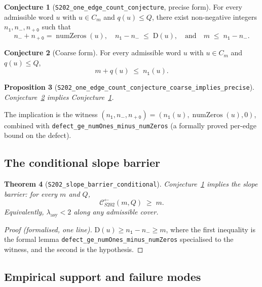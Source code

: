 \documentclass[11pt,a4paper]{article}
\theoremstyle{plain}
\newtheorem{theorem}{Theorem}[section]
\newtheorem{proposition}[theorem]{Proposition}
\theoremstyle{definition}
\newtheorem{conjecture}[theorem]{Conjecture}
\newcommand{\defect}{\mathrm{D}}
\newcommand{\Cback}{\mathcal{C}^{\!\leftarrow}_{S202}}
\newcommand{\numOnes}{n_{\mathtt{1}}}
\newcommand{\numNeg}{n_{\!-}}
\newcommand{\numPosZero}{n_{\!+\mathtt{0}}}
\DeclareMathOperator{\numZeros}{numZeros}
\begin{document}
\begin{conjecture}[\texttt{S202\_one\_edge\_count\_conjecture}, precise form]\label{conj:precise}
For every admissible word $u$ with $u \in C_m$ and $q(u) \le Q$,
there exist non-negative integers $\numOnes, \numNeg, \numPosZero$
such that
\[
  \numNeg + \numPosZero = \numZeros(u),
  \quad
  \numOnes - \numNeg \;\le\; \defect(u),
  \quad\text{and}\quad
  m \;\le\; \numOnes - \numNeg.
\]
\end{conjecture}

\begin{conjecture}[Coarse form]\label{conj:coarse}
For every admissible word $u$ with $u \in C_m$ and $q(u) \le Q$,
\[
  m + q(u) \;\le\; \numOnes(u).
\]
\end{conjecture}

\begin{proposition}[\texttt{S202\_one\_edge\_count\_conjecture\_coarse\_implies\_precise}]
Conjecture~\ref{conj:coarse} implies Conjecture~\ref{conj:precise}.
\end{proposition}

The implication is the witness
$(\numOnes, \numNeg, \numPosZero) = (\numOnes(u), \numZeros(u), 0)$,
combined with \texttt{defect\_ge\_numOnes\_minus\_numZeros} (a
formally proved per-edge bound on the defect).

\subsection{The conditional slope barrier}

\begin{theorem}[\texttt{S202\_slope\_barrier\_conditional}]\label{thm:slope-conditional}
Conjecture~\ref{conj:precise} implies the slope barrier: for every
$m$ and $Q$,
\[
  \Cback(m, Q) \;\ge\; m.
\]
Equivalently, $\lambda_{\mathrm{asy}} < 2$ along any admissible
cover.
\end{theorem}

\begin{proof}[Proof (formalised, one line)]
$\defect(u) \ge \numOnes - \numNeg \ge m$, where the first inequality
is the formal lemma \texttt{defect\_ge\_numOnes\_minus\_numZeros}
specialised to the witness, and the second is the hypothesis.
\end{proof}

\subsection{Empirical support and failure modes}
\end{document}
